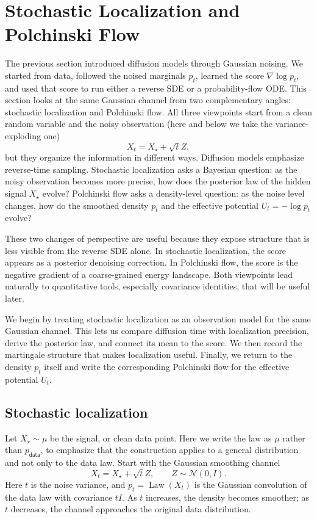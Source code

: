 \documentclass[10pt,a4paper]{amsart}
\numberwithin{equation}{section}
\DeclareMathOperator{\Law}{Law}
\newcommand{\Id}{I}
\newcommand{\pdata}{p_{\mathsf{data}}}
\newcommand{\normal}[2]{\mathcal{N}\!\left(#1,#2\right)}
\begin{document}
\section{Stochastic Localization and Polchinski Flow}
\label{sec:stochastic-localization-polchinski}

The previous section introduced diffusion models through Gaussian noising.  We
started from data, followed the noised marginals $p_t$, learned the score
$\nabla\log p_t$, and used that score to run either a reverse SDE or a
probability-flow ODE\@.  This section looks at the same Gaussian channel from two
complementary angles: stochastic localization and Polchinski flow.  All three
viewpoints start from a clean random variable and the noisy observation (here and below we take the variance-exploding one)
\[
    X_t=X_\star+\sqrt{t}Z,
\]
but they organize the information in different ways.  Diffusion models
emphasize reverse-time sampling.  Stochastic localization asks a Bayesian
question: as the noisy observation becomes more precise, how does the posterior
law of the hidden signal $X_\star$ evolve?  Polchinski flow asks a
density-level question: as the noise level changes, how do the smoothed density
$p_t$ and the effective potential $U_t=-\log p_t$ evolve?

These two changes of perspective are useful because they expose structure that
is less visible from the reverse SDE alone.  In stochastic localization, the
score appears as a posterior denoising correction.  In Polchinski flow, the
score is the negative gradient of a coarse-grained energy landscape.  Both
viewpoints lead naturally to quantitative tools, especially covariance
identities, that will be useful later.

We begin by treating stochastic localization as an observation model for the
same Gaussian channel.  This lets us compare diffusion time with localization
precision, derive the posterior law, and connect its mean to the score.  We
then record the martingale structure that makes localization useful.  Finally,
we return to the density $p_t$ itself and write the corresponding
Polchinski flow for the effective potential $U_t$.

\subsection{Stochastic localization}
\label{subsec:stochastic-localization}

Let $X_\star\sim\mu$ be the signal, or clean data point.  Here we write the law
as $\mu$ rather than $\pdata$, to emphasize that the construction applies to a
general distribution and not only to the data law.  Start with the
Gaussian smoothing channel
\[
    X_t=X_\star+\sqrt{t}Z,\qquad Z\sim\normal{0}{\Id}.
\]
Here $t$ is the noise variance, and $p_t=\Law(X_t)$ is the Gaussian
convolution of the data law with covariance $t\Id$.  As $t$ increases,
the density becomes smoother; as $t$ decreases, the channel approaches the
original data distribution.
\end{document}
